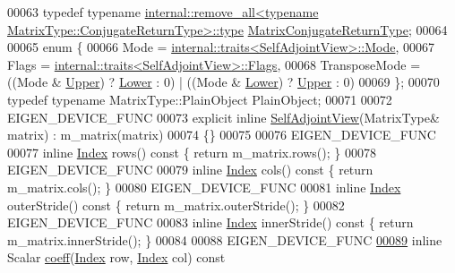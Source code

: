 \begin{DoxyCode}
00063     \textcolor{keyword}{typedef} \textcolor{keyword}{typename} 
      \hyperlink{group___sparse_core___module}{internal::remove\_all<typename MatrixType::ConjugateReturnType>::type}
       \hyperlink{group___sparse_core___module}{MatrixConjugateReturnType};
00064 
00065     \textcolor{keyword}{enum} \{
00066       Mode = \hyperlink{struct_eigen_1_1internal_1_1traits}{internal::traits<SelfAdjointView>::Mode},
00067       Flags = \hyperlink{struct_eigen_1_1internal_1_1traits}{internal::traits<SelfAdjointView>::Flags},
00068       TransposeMode = ((Mode & \hyperlink{group__enums_gga39e3366ff5554d731e7dc8bb642f83cda6bcb58be3b8b8ec84859ce0c5ac0aaec}{Upper}) ? \hyperlink{group__enums_gga39e3366ff5554d731e7dc8bb642f83cda891792b8ed394f7607ab16dd716f60e6}{Lower} : 0) | ((Mode & \hyperlink{group__enums_gga39e3366ff5554d731e7dc8bb642f83cda891792b8ed394f7607ab16dd716f60e6}{Lower}) ? 
      \hyperlink{group__enums_gga39e3366ff5554d731e7dc8bb642f83cda6bcb58be3b8b8ec84859ce0c5ac0aaec}{Upper} : 0)
00069     \};
00070     \textcolor{keyword}{typedef} \textcolor{keyword}{typename} MatrixType::PlainObject PlainObject;
00071 
00072     EIGEN\_DEVICE\_FUNC
00073     \textcolor{keyword}{explicit} \textcolor{keyword}{inline} \hyperlink{group___core___module_class_eigen_1_1_self_adjoint_view}{SelfAdjointView}(MatrixType& matrix) : m\_matrix(matrix)
00074     \{\}
00075 
00076     EIGEN\_DEVICE\_FUNC
00077     \textcolor{keyword}{inline} \hyperlink{group___core___module_a554f30542cc2316add4b1ea0a492ff02}{Index} rows()\textcolor{keyword}{ const }\{ \textcolor{keywordflow}{return} m\_matrix.rows(); \}
00078     EIGEN\_DEVICE\_FUNC
00079     \textcolor{keyword}{inline} \hyperlink{group___core___module_a554f30542cc2316add4b1ea0a492ff02}{Index} cols()\textcolor{keyword}{ const }\{ \textcolor{keywordflow}{return} m\_matrix.cols(); \}
00080     EIGEN\_DEVICE\_FUNC
00081     \textcolor{keyword}{inline} \hyperlink{group___core___module_a554f30542cc2316add4b1ea0a492ff02}{Index} outerStride()\textcolor{keyword}{ const }\{ \textcolor{keywordflow}{return} m\_matrix.outerStride(); \}
00082     EIGEN\_DEVICE\_FUNC
00083     \textcolor{keyword}{inline} \hyperlink{group___core___module_a554f30542cc2316add4b1ea0a492ff02}{Index} innerStride()\textcolor{keyword}{ const }\{ \textcolor{keywordflow}{return} m\_matrix.innerStride(); \}
00084 
00088     EIGEN\_DEVICE\_FUNC
\hyperlink{group___core___module_ad49cb2f908a2069cbacf9836b9bd6b84}{00089}     \textcolor{keyword}{inline} Scalar \hyperlink{group___core___module_ad49cb2f908a2069cbacf9836b9bd6b84}{coeff}(\hyperlink{group___core___module_a554f30542cc2316add4b1ea0a492ff02}{Index} row, \hyperlink{group___core___module_a554f30542cc2316add4b1ea0a492ff02}{Index} col)\textcolor{keyword}{ const}

\end{DoxyCode}
